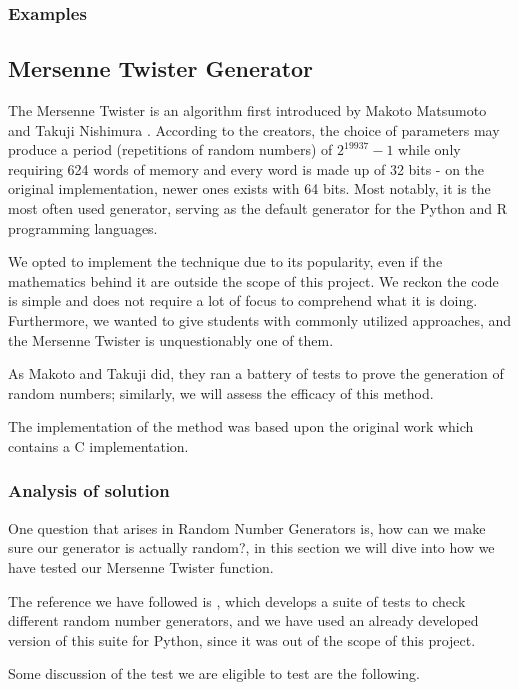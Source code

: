 \subsubsection{Examples}
	


\subsection{Mersenne Twister Generator}
The Mersenne Twister is an algorithm first introduced by Makoto Matsumoto and Takuji Nishimura \cite{matsumoto1998mersenne}. According to the creators, the choice of parameters may produce a period (repetitions of random numbers) of $2^{19937}-1$ while only requiring 624 words of memory and every word is made up of 32 bits - on the original implementation, newer ones exists with 64 bits. Most notably, it is the most often used generator, serving as the default generator for the Python and R programming languages.

We opted to implement the technique due to its popularity, even if the mathematics behind it are outside the scope of this project. We reckon the code is simple and does not require a lot of focus to comprehend what it is doing. Furthermore, we wanted to give students with commonly utilized approaches, and the Mersenne Twister is unquestionably one of them.

As Makoto and Takuji did, they ran a battery of tests to prove the generation of random numbers; similarly, we will assess the efficacy of this method.

The implementation of the method was based upon the original work \cite{matsumoto1998mersenne} which contains a C implementation.
\subsubsection{Analysis of solution}
One question that arises in Random Number Generators is, how can we make sure our generator is actually random?, in this section we will dive into how we have tested our Mersenne Twister function.

The reference we have followed is \cite{smid2010statistical}, which develops a suite of tests to check different random number generators, and we have used an already developed version of this suite for Python\cite{InsaneMonster2022}, since it was out of the scope of this project. 

Some discussion of the test we are eligible to test are the following.


